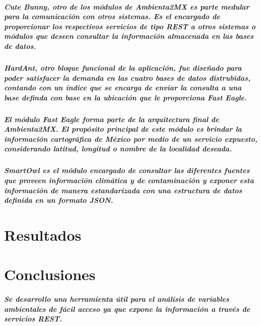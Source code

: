 \documentclass[12pt]{report}
\begin{document}
  \paragraph{Cute Bunny, otro de los módulos de Ambienta2MX es parte medular para la comunicación con otros sistemas. Es el encargado de proporcionar los respectivos servicios de tipo REST a otros sistemas o módulos que deseen consultar la información almacenada en las bases de datos.}

  \paragraph{HardAnt, otro bloque funcional de la aplicación, fue diseñado para poder satisfacer la demanda en las cuatro bases de datos distrubidas, contando con un índice que se encarga de enviar la consulta a una base definda con base en la ubicación que le proporciona Fast Eagle.}

  \paragraph{El módulo Fast Eagle forma parte de la arquitectura final de Ambienta2MX. El propósito principal de este módulo es brindar la información cartográfica de México por medio de un servicio expuesto, considerando latitud, longitud o nombre de la localidad deseada.}

  \paragraph{SmartOwl es el módulo encargado de consultar las diferentes fuentes que proveen información climática y de contaminación y exponer esta información de manera estandarizada con una estructura de datos definida en un formato JSON.}


\chapter{Resultados}
    
\chapter{Conclusiones}
  \paragraph{Se desarrollo una herramienta útil para el análisis de variables ambientales de fácil acceso ya que expone la información a través de servicios REST. \\}
\end{document}
